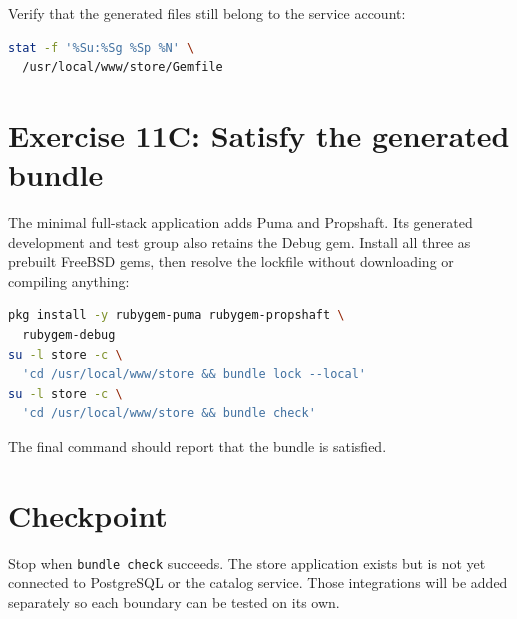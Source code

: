 Verify that the generated files still belong to the service account:

\begin{lstlisting}[language=sh]
stat -f '%Su:%Sg %Sp %N' \
  /usr/local/www/store/Gemfile
\end{lstlisting}

\section{Exercise 11C: Satisfy the generated bundle}

The minimal full-stack application adds Puma and Propshaft. Its generated
development and test group also retains the Debug gem. Install all three as
prebuilt FreeBSD gems, then resolve the lockfile without downloading or
compiling anything:

\begin{lstlisting}[language=sh]
pkg install -y rubygem-puma rubygem-propshaft \
  rubygem-debug
su -l store -c \
  'cd /usr/local/www/store && bundle lock --local'
su -l store -c \
  'cd /usr/local/www/store && bundle check'
\end{lstlisting}

The final command should report that the bundle is satisfied.

\section{Checkpoint}

Stop when \texttt{bundle check} succeeds. The store application exists but is
not yet connected to PostgreSQL or the catalog service. Those integrations
will be added separately so each boundary can be tested on its own.
